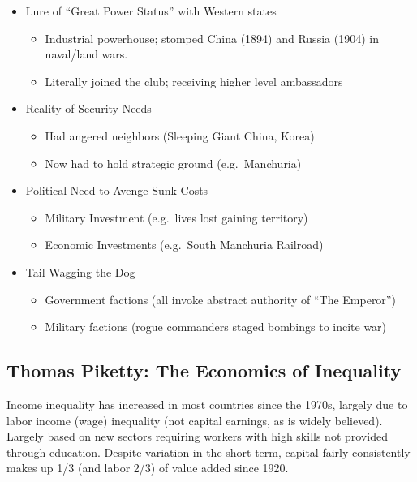 \documentclass[
]{article}
\begin{document}
\begin{itemize}
\item
  Lure of ``Great Power Status'' with Western states

  \begin{itemize}
  \item
    Industrial powerhouse; stomped China (1894) and Russia (1904) in
    naval/land wars.
  \item
    Literally joined the club; receiving higher level ambassadors
  \end{itemize}
\item
  Reality of Security Needs

  \begin{itemize}
  \item
    Had angered neighbors (Sleeping Giant China, Korea)
  \item
    Now had to hold strategic ground (e.g.~Manchuria)
  \end{itemize}
\item
  Political Need to Avenge Sunk Costs

  \begin{itemize}
  \item
    Military Investment (e.g.~lives lost gaining territory)
  \item
    Economic Investments (e.g.~South Manchuria Railroad)
  \end{itemize}
\item
  Tail Wagging the Dog

  \begin{itemize}
  \item
    Government factions (all invoke abstract authority of ``The
    Emperor'')
  \item
    Military factions (rogue commanders staged bombings to incite war)
  \end{itemize}
\end{itemize}

\hypertarget{thomas-piketty-the-economics-of-inequality}{%
\subsection{Thomas Piketty: The Economics of
Inequality}\label{thomas-piketty-the-economics-of-inequality}}

Income inequality has increased in most countries since the 1970s,
largely due to labor income (wage) inequality (not capital earnings, as
is widely believed). Largely based on new sectors requiring workers with
high skills not provided through education. Despite variation in the
short term, capital fairly consistently makes up 1/3 (and labor 2/3) of
value added since 1920.
\end{document}
